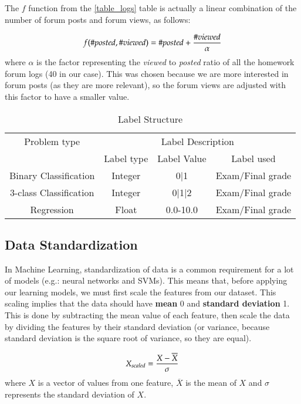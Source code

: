 The $f$ function from the \ref{table_logs} table is actually a linear combination 
of the number of forum posts and forum views, as follows:

\begin{equation}
\centering
f(\#posted, \#viewed) = \#posted + \frac{\#viewed}{\alpha}
\end{equation}
where $\alpha$ is the factor representing the {\it viewed} to {\it posted} ratio of all 
the homework forum logs (40 in our case). This was chosen because we are more 
interested in forum posts (as they are more relevant), so the forum views 
are adjusted with this factor to have a smaller value.


\begin{table}[ht]
\centering
\begin{tabular}{cccc}
\toprule
\multicolumn{1}{c}{Problem type} & \multicolumn{3}{c}{Label Description} \\
\cmidrule(r){2-4}
                        & Label type  & Label Value & Label used \\
\midrule
Binary Classification   & Integer     & 0|1          & Exam/Final grade \\
3-class Classification  & Integer     & 0|1|2        & Exam/Final grade \\
Regression              & Float       & 0.0-10.0     & Exam/Final grade \\
\bottomrule
\end{tabular}
\caption[Label Structure]{Label Structure}
\label{table_2}
\end{table}

\subsection{Data Standardization}

In Machine Learning, standardization of data is a common requirement for a 
lot of models (e.g.: neural networks and SVMs). This means that, before 
applying our learning models, we must first scale the features from our dataset. 
This scaling implies that the data should have {\bf mean} 0 and {\bf standard 
deviation} 1. This is done by subtracting the mean value of each feature, then 
scale the data by dividing the features by their standard deviation (or variance, 
because standard deviation is the square root of variance, so they are equal).

\begin{equation}
\centering
X_{scaled} = \frac{X-\overline{X}}{\sigma}
\end{equation}
where $X$ is a vector of values from one feature, $\overline{X}$ is the mean of $X$ and 
$\sigma$ represents the standard deviation of $X$.

